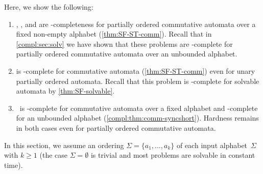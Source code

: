 
Here, we show the following:
\begin{enumerate}
\item \DFAINT, \DST, and \ST are \LOGSPACE-completeness for partially ordered commutative automata
over a fixed non-empty alphabet (\cref{thm:SF-ST-comm}).
Recall that in \cref{compl:sec:solv} we have shown that these problems
are \NP-complete for partially ordered commutative automata over an unbounded alphabet.

\item \SFS is \LOGSPACE-complete for commutative automata (\cref{thm:SF-ST-comm})
even for unary partially ordered automata. Recall that this problem is \NP-complete
for solvable automata by \cref{thm:SF-solvable}.

\item \DFASWS\ is \LOGSPACE-complete for commutative automata over a fixed alphabet 
and \NP-complete for an unbounded alphabet (\cref{compl:thm:comm-syncshort}).
Hardness remains in both cases even for partially ordered commutative automata.
\end{enumerate}

In this section, we assume an ordering $\Sigma = \{a_1, \ldots, a_k\}$ of each input alphabet~$\Sigma$
with $k \ge 1$ (the case $\Sigma = \emptyset$ is trivial and most problems are solvable in constant time).

